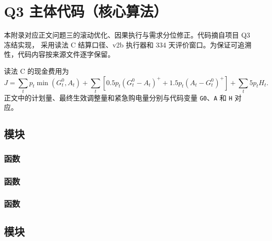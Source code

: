 \section{Q3 主体代码（核心算法）}\label{app:q3-core-code}

本附录对应正文问题三的滚动优化、因果执行与需求分位修正。代码摘自项目 Q3 冻结实现，
采用读法 C 结算口径、v2b 执行器和 334 天评价窗口。为保证可追溯性，代码内容按来源文件逐字保留。

读法 C 的现金费用为
\begin{equation}
J=\sum_t p_t\min(G_t^0,A_t)+\sum_t\!\left[0.5p_t(G_t^0-A_t)^+ +1.5p_t(A_t-G_t^0)^+\right]+\sum_t5p_tH_t.
\label{eq:app-cash-c}
\end{equation}
正文中的计划量、最终生效调整量和紧急购电量分别与代码变量 \lstinline|G0|、\lstinline|A| 和 \lstinline|H| 对应。

\subsection{模块 \texttt{}}

\subsubsection{函数 \texttt{}}


\subsubsection{函数 \texttt{}}


\subsubsection{函数 \texttt{}}


\subsection{模块 \texttt{}}

